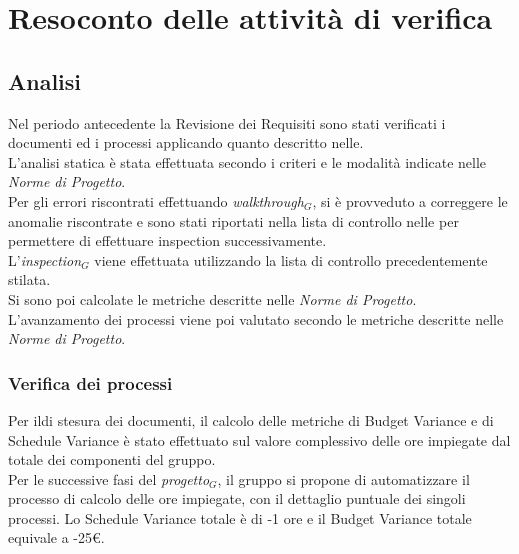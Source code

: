 \chapter{Resoconto delle attività di verifica}
\label{resoconto}
\section{Analisi}\label{Analisi}
Nel periodo antecedente la Revisione dei Requisiti sono stati verificati i documenti ed i processi applicando quanto descritto nelle\normediprogetto.\\
L'analisi statica è stata effettuata secondo i criteri e le modalità indicate nelle \textit{Norme di Progetto}.\\ 
Per gli errori riscontrati effettuando \textit{walkthrough$_{G}$}, si è provveduto a correggere le anomalie riscontrate e sono stati riportati nella lista di controllo nelle \normediprogetto per permettere di effettuare inspection successivamente.\\
L'\textit{inspection$_{G}$} viene effettuata utilizzando la lista di controllo precedentemente stilata. \\
Si sono poi calcolate le metriche descritte nelle \textit{Norme di Progetto}.\\
L'avanzamento dei processi viene poi valutato secondo le metriche descritte nelle \textit{Norme di Progetto}. 
\subsection{Verifica dei processi}
Per ildi stesura dei documenti, il calcolo delle metriche di Budget Variance e di Schedule Variance è stato effettuato sul valore complessivo delle ore impiegate dal totale dei componenti del gruppo.\\
Per le successive fasi del \textit{progetto$_{G}$}, il gruppo si propone di automatizzare il processo di calcolo delle ore impiegate, con il dettaglio puntuale dei singoli processi.
Lo Schedule Variance totale è di -1 ore e il Budget Variance totale equivale a -25\euro.

